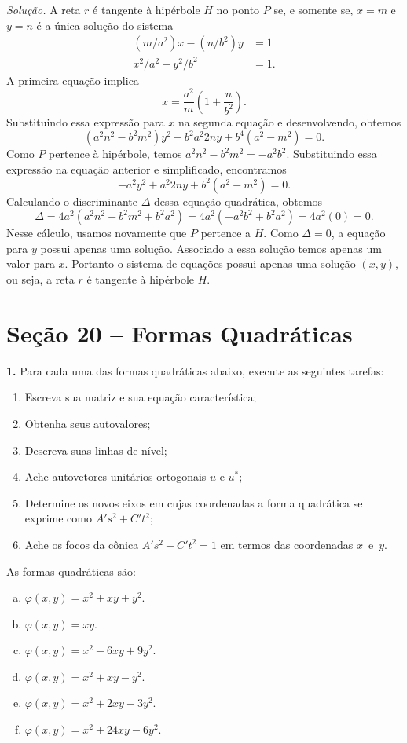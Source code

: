 \documentclass[a4paper,11pt]{article}
\begin{document}
\vspace{\baselineskip}

\emph{Solução.}
A reta $r$ é tangente à hipérbole $H$ no ponto $P$ se, e somente se, $x = m$ e $y = n$ é a única solução do sistema
\begin{align*}
  (m/a^2) x - (n/b^2) y & = 1 \\
  x^2/a^2 - y^2/b^2 & = 1.
\end{align*}
A primeira equação implica
\[
  x = \frac{a^2}{m} \left( 1 + \frac{n}{b^2} \right).
\]
Substituindo essa expressão para $x$ na segunda equação e desenvolvendo, obtemos
\[
  (a^2 n^2 - b^2 m^2) y^2 + b^2 a^2 2ny + b^4(a^2 - m^2) = 0.
\]
Como $P$ pertence à hipérbole, temos $a^2 n^2 - b^2 m^2 = -a^2 b^2$.
Substituindo essa expressão na equação anterior e simplificado, encontramos
\[
  -a^2 y^2 + a^2 2ny + b^2 (a^2 - m^2) = 0.
\]
Calculando o discriminante $\Delta$ dessa equação quadrática, obtemos
\[
  \Delta = 4 a^2 ( a^2 n^2 - b^2 m^2 + b^2 a^2 ) = 4 a^2 (-a^2 b^2 + b^2 a^2 ) = 4 a^2 (0) = 0.
\]
Nesse cálculo, usamos novamente que $P$ pertence a $H$.
Como $\Delta = 0$, a equação para $y$ possui apenas uma solução.
Associado a essa solução temos apenas um valor para $x$.
Portanto o sistema de equações possui apenas uma solução $(x,y)$, ou seja, a reta $r$ é tangente à hipérbole $H$.

\section*{Seção 20 -- Formas Quadráticas}

\textbf{1.}
Para cada uma das formas quadráticas abaixo, execute as seguintes tarefas:
\begin{enumerate}
  \item
    Escreva sua matriz e sua equação característica;
  \item
    Obtenha seus autovalores;
  \item
    Descreva suas linhas de nível;
  \item
    Ache autovetores unitários ortogonais $u$ e $u^*$;
  \item
    Determine os novos eixos em cujas coordenadas a forma quadrática se exprime como $A' s^2 + C' t^2$;
  \item
    Ache os focos da cônica $A' s^2 + C' t^2 = 1$ em termos das coordenadas $x$~e~$y$.
\end{enumerate}
As formas quadráticas são:
\begin{enumerate}[(a)]
  \item
    $\varphi(x,y) = x^2 + xy + y^2$.
  \item
    $\varphi(x,y) = xy$.
  \item
    $\varphi(x,y) = x^2 -6 xy +9 y^2$.
  \item
    $\varphi(x,y) = x^2 + xy - y^2$.
  \item
    $\varphi(x,y) = x^2 +2 xy -3 y^2$.
  \item
    $\varphi(x,y) = x^2 +24 xy -6 y^2$.
\end{enumerate}
\end{document}
